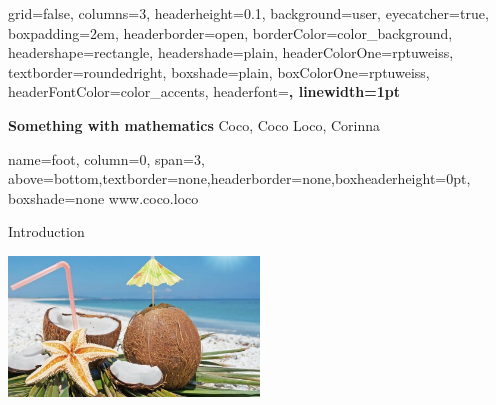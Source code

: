 \documentclass[
  a0paper,
  portrait,
  fontscale=.35 %
  ]{baposter}
\begin{document}
\background{
  \begin{tikzpicture}[remember picture,overlay]%
    \fill [fill=color_background] (current page.north west) rectangle (current page.south east);
  \end{tikzpicture}
}

\begin{poster}{
    grid=false,
    columns=3,
    headerheight=0.1\textheight,
    background=user,
    eyecatcher=true,
    boxpadding=2em,
    headerborder=open,
    borderColor=color_background,
    headershape=rectangle,
    headershade=plain,
    headerColorOne=rptuweiss,
    textborder=roundedright,
    boxshade=plain,
    boxColorOne=rptuweiss,
    headerFontColor=color_accents,
    headerfont=\Large\sf\bf,
    linewidth=1pt
  }
  {
  
  }
  {%
  \color{rptuweiss}\bf \LARGE%
  Something with mathematics
  }
  {\color{rptuweiss}\large%
	Coco, Coco Loco, Corinna %
  }
  {
    
  }
  
  \headerbox{}%
  {name=foot, column=0, span=3, above=bottom,textborder=none,headerborder=none,boxheaderheight=0pt, boxshade=none}
  {\hfill \vspace{0.5em}  \hfill \color{white} \huge www.coco.loco \hfill \hfill \raisebox{-0.5em}{} \hspace{0.75em} \raisebox{-0.25em}{} \vspace{-0.5em}}
  
\begin{posterbox}[name=intro,column=0,row=0, span=3]{Introduction}
	\begin{center}
		\includegraphics[width=0.5\textwidth]{imgs/coco_loco.jpg}
	\end{center}
\end{posterbox}


\end{poster}
\end{document}
